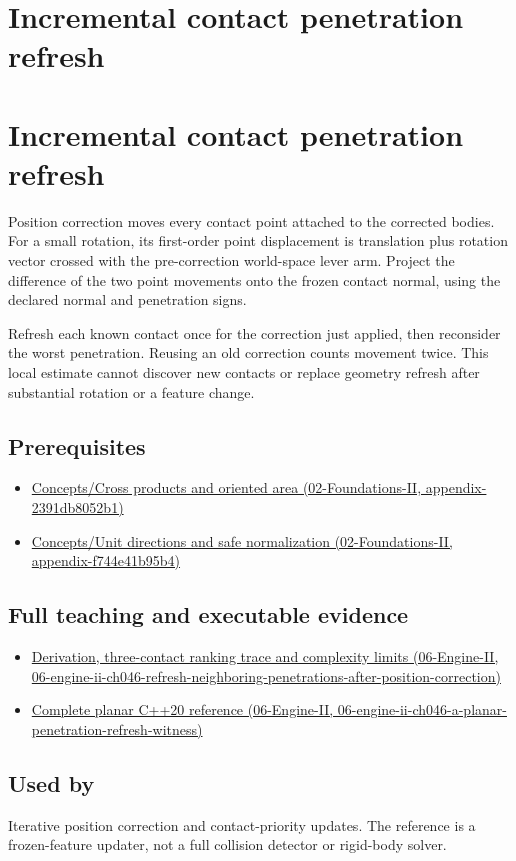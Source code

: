 \hypertarget{appendix-f682275acbdf}{}
\section*{Incremental contact penetration refresh}
\section{Incremental contact penetration refresh}\label{appendix-f682275acbdf-incremental-contact-penetration-refresh}

Position correction moves every contact point attached to the corrected bodies. For a small rotation, its first-order point displacement is translation plus rotation vector crossed with the pre-correction world-space lever arm. Project the difference of the two point movements onto the frozen contact normal, using the declared normal and penetration signs.

Refresh each known contact once for the correction just applied, then reconsider the worst penetration. Reusing an old correction counts movement twice. This local estimate cannot discover new contacts or replace geometry refresh after substantial rotation or a feature change.

\subsection{Prerequisites}\label{appendix-f682275acbdf-prerequisites}

\begin{itemize}
\tightlist
\item
  \href{../02-Foundations-II/main.pdf\#nameddest=appendix-2391db8052b1}{Concepts/Cross products and oriented area (02-Foundations-II, appendix-2391db8052b1)}
\item
  \href{../02-Foundations-II/main.pdf\#nameddest=appendix-f744e41b95b4}{Concepts/Unit directions and safe normalization (02-Foundations-II, appendix-f744e41b95b4)}
\end{itemize}

\subsection{Full teaching and executable evidence}\label{appendix-f682275acbdf-full-teaching-and-executable-evidence}

\begin{itemize}
\tightlist
\item
  \href{../06-Engine-II/main.pdf\#nameddest=06-engine-ii-ch046-refresh-neighboring-penetrations-after-position-correction}{Derivation, three-contact ranking trace and complexity limits (06-Engine-II, 06-engine-ii-ch046-refresh-neighboring-penetrations-after-position-correction)}
\item
  \href{../06-Engine-II/main.pdf\#nameddest=06-engine-ii-ch046-a-planar-penetration-refresh-witness}{Complete planar C++20 reference (06-Engine-II, 06-engine-ii-ch046-a-planar-penetration-refresh-witness)}
\end{itemize}

\subsection{Used by}\label{appendix-f682275acbdf-used-by}

Iterative position correction and contact-priority updates. The reference is a frozen-feature updater, not a full collision detector or rigid-body solver.
